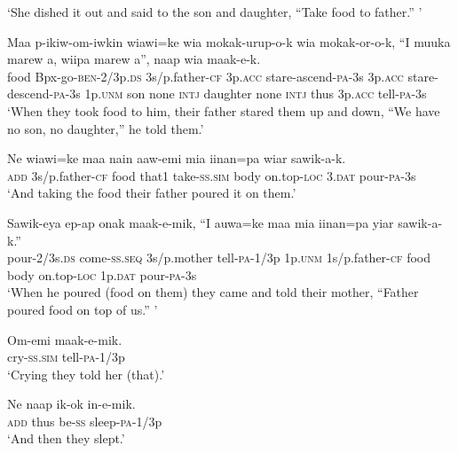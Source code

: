 \glt ‘She dished it out and said to the son and daughter, “Take food to father.” ’ \\
\z


\ea
\gll  Maa  p-ikiw-om-iwkin  wiawi=ke  wia  mokak-urup-o-k              wia  mokak-or-o-k,  “I  muuka  marew  a,  wiipa                 marew  a”,  naap  wia  maak-e-k. \\
food  Bpx-go-\textsc{ben}-2/3p.\textsc{ds}  3s/p.father-\textsc{cf}  3p.\textsc{acc}  stare-ascend-\textsc{pa}-3s   3p.\textsc{acc}  stare-descend-\textsc{pa}-3s  1p.\textsc{unm}  son  none  \textsc{intj}  daughter  none  \textsc{intj}  thus  3p.\textsc{acc}  tell-\textsc{pa}-3s \\




\glt ‘When they took food to him, their father stared them up and down, “We have no son, no daughter,” he told them.’ \\
\z


\ea
\gll  Ne  wiawi=ke  maa  nain  aaw-emi  mia  iinan=pa  wiar  sawik-a-k. \\
\textsc{add}  3s/p.father-\textsc{cf}  food  that1  take-\textsc{ss}.\textsc{sim}  body  on.top-\textsc{loc}  3.\textsc{dat}  pour-\textsc{pa}-3s \\
\glt ‘And taking the food their father poured it on them.’ \\
\z


\ea
\gll  Sawik-eya  ep-ap  onak  maak-e-mik,  “I  auwa=ke                         maa  mia  iinan=pa  yiar  sawik-a-k.” \\
pour-2/3s.\textsc{ds}  come-\textsc{ss.seq}  3s/p.mother  tell-\textsc{pa}-1/3p  1p.\textsc{unm}  1s/p.father-\textsc{cf}   food  body  on.top-\textsc{loc}  1p.\textsc{dat}  pour-\textsc{pa}-3s \\


\glt ‘When he poured (food on them) they came and told their mother, “Father poured food on top of us.” ’ \\
\z


\ea
\gll  Om-emi  maak-e-mik. \\
cry-\textsc{ss}.\textsc{sim}  tell-\textsc{pa}-1/3p \\
\glt ‘Crying they told her (that).’ \\
\z


\ea
\gll  Ne  naap  ik-ok  in-e-mik. \\
\textsc{add}  thus  be-\textsc{ss}  sleep-\textsc{pa}-1/3p \\
\glt ‘And then they slept.’ \\
\z


